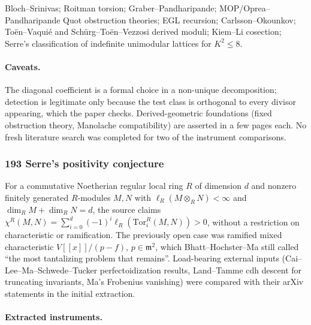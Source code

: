 \documentclass[11pt]{article}
\newcommand{\badges}[1]{\par\noindent{\small\sffamily\color{black!70}#1}\par\smallskip}
\newcommand{\badgesep}{\textbar}
\begin{document}
Bloch--Srinivas; Roitman torsion; Graber--Pandharipande; MOP/Oprea--Pandharipande Quot obstruction theories; EGL recursion; Carlsson--Okounkov; Toën--Vaquié and Schürg--Toën--Vezzosi derived moduli; Kiem--Li cosection; Serre's classification of indefinite unimodular lattices for $K^{2} \le 8$.

\paragraph{Caveats.}

The diagonal coefficient is a formal choice in a non-unique decomposition; detection is legitimate only because the test class is orthogonal to every divisor appearing, which the paper checks. Derived-geometric foundations (fixed obstruction theory, Manolache compatibility) are asserted in a few pages each. No fresh literature search was completed for two of the instrument comparisons.

\subsubsection{\texorpdfstring{193 \textperiodcentered{} Serre's positivity conjecture}{193 · Serre's positivity conjecture}}\label{fam:193}
\badges{not formalized \badgesep{} new device}

For a commutative Noetherian regular local ring $R$ of dimension $d$ and nonzero finitely generated $R$-modules $M,N$ with $\ell_R(M\otimes_R N)<\infty$ and $\dim_R M+\dim_R N=d$, the source claims $\chi^R(M,N)=\sum_{i=0}^d(-1)^i\ell_R(\mathrm{Tor}_i^R(M,N))>0$, without a restriction on characteristic or ramification. The previously open case was ramified mixed characteristic $V[[x]]/(p-f)$, $p\in\mathfrak m^2$, which Bhatt--Hochster--Ma still called ``the most tantalizing problem that remains''. Load-bearing external inputs (Cai--Lee--Ma--Schwede--Tucker perfectoidization results, Land--Tamme cdh descent for truncating invariants, Ma's Frobenius vanishing) were compared with their arXiv statements in the initial extraction.

\paragraph{Extracted instruments.}
\end{document}
